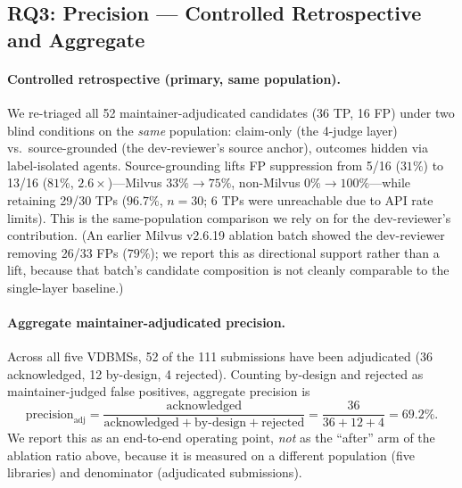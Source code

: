 \documentclass[sigconf]{acmart}
\begin{document}
\subsection{RQ3: Precision --- Controlled Retrospective and Aggregate}\label{sec:eval-rq3}

\paragraph{Controlled retrospective (primary, same population).} We re-triaged all 52 maintainer-adjudicated candidates (36 TP, 16 FP) under two blind conditions on the \emph{same} population: claim-only (the 4-judge layer) vs.\ source-grounded (the dev-reviewer's source anchor), outcomes hidden via label-isolated agents. Source-grounding lifts FP suppression from 5/16 ($31\%$) to 13/16 ($81\%$, $2.6\times$)---Milvus $33\%{\to}75\%$, non-Milvus $0\%{\to}100\%$---while retaining 29/30 TPs ($96.7\%$, $n{=}30$; 6 TPs were unreachable due to API rate limits). This is the same-population comparison we rely on for the dev-reviewer's contribution. (An earlier Milvus v2.6.19 ablation batch showed the dev-reviewer removing 26/33 FPs ($79\%$); we report this as directional support rather than a lift, because that batch's candidate composition is not cleanly comparable to the single-layer baseline.)

\paragraph{Aggregate maintainer-adjudicated precision.} Across all five VDBMSs, 52 of the 111 submissions have been adjudicated (36 acknowledged, 12 by-design, 4 rejected). Counting by-design and rejected as maintainer-judged false positives, aggregate precision is
\[
\mathrm{precision}_{\mathrm{adj}} = \frac{\mathrm{acknowledged}}{\mathrm{acknowledged}+\mathrm{by\text{-}design}+\mathrm{rejected}} = \frac{36}{36+12+4} = 69.2\%.
\]
We report this as an end-to-end operating point, \emph{not} as the ``after'' arm of the ablation ratio above, because it is measured on a different population (five libraries) and denominator (adjudicated submissions).
\end{document}
